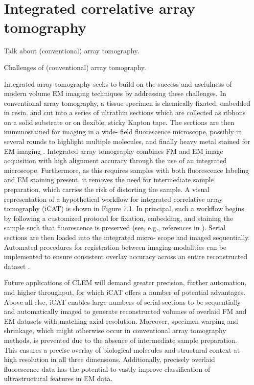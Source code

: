 \section{Integrated correlative array tomography}

Talk about (conventional) array tomography.

Challenges of (conventional) array tomography.

Integrated array tomography seeks to build on the success and usefulness of modern volume EM imaging techniques by addressing these challenges. In conventional array tomography, a tissue specimen is chemically fixated, embedded in resin, and cut into a series of ultrathin sections which are collected as ribbons on a solid substrate or on flexible, sticky Kapton tape. The sections are then immunostained for imaging in a wide- field fluorescence microscope, possibly in several rounds to highlight multiple molecules, and finally heavy metal stained for EM imaging \cite{micheva2007array, wacker2013array}. Integrated array tomography combines FM and EM image acquisition with high alignment accuracy through the use of an integrated microscope. Furthermore, as this requires samples with both fluorescence labeling and EM staining present, it removes the need for intermediate sample preparation, which carries the risk of distorting the sample. A visual representation of a hypothetical workflow for integrated correlative array tomography (iCAT) is shown in Figure 7.1. In principal, such a workflow begins by following a customized protocol for fixation, embedding, and staining the sample such that fluorescence is preserved (see, e.g., references in \textcite{de2015correlated}). Serial sections are then loaded into the integrated micro- scope and imaged sequentially. Automated procedures for registration between imaging modalities can be implemented to ensure consistent overlay accuracy across an entire reconstructed dataset \cite{haring2017automated}.

Future applications of CLEM will demand greater precision, further automation, and higher throughput, for which iCAT offers a number of potential advantages. Above all else, iCAT enables large numbers of serial sections to be sequentially and automatically imaged to generate reconstructed volumes of overlaid FM and EM datasets with matching axial resolution. Moreover, specimen warping and shrinkage, which might otherwise occur in conventional array tomography methods, is prevented due to the absence of intermediate sample preparation. This ensures a precise overlay of biological molecules and structural context at high resolution in all three dimensions. Additionally, precisely overlaid fluorescence data has the potential to vastly improve classification of ultrastructural features in EM data.

